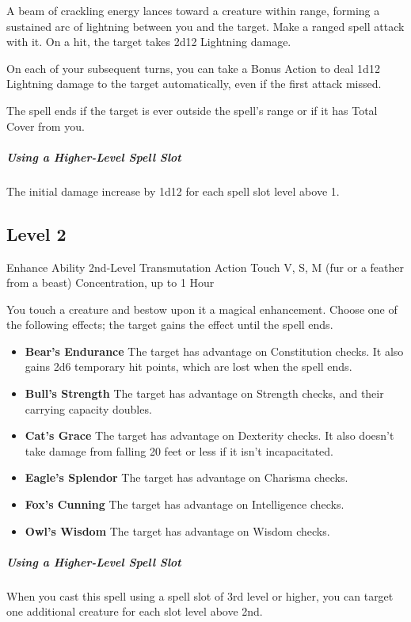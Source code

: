 \documentclass[letterpaper,openany,oneside,twocolumn]{book}
\begin{document}
A beam of crackling energy lances toward a creature within range, forming a sustained arc of lightning between you and the target. Make a ranged spell attack with it. On a hit, the target takes 2d12 Lightning damage.

On each of your subsequent turns, you can take a Bonus Action to deal 1d12 Lightning damage to the target automatically, even if the first attack missed.

The spell ends if the target is ever outside the spell's range or if it has Total Cover from you.

\subparagraph*{Using a Higher-Level Spell Slot} The initial damage increase by 1d12 for each spell slot level above 1.

\subsection*{Level 2}

\DndSpellHeader
  {Enhance Ability}
  {2nd-Level Transmutation}
  {Action}
  {Touch}
  {V, S, M (fur or a feather from a beast)}
  {Concentration, up to 1 Hour}

You touch a creature and bestow upon it a magical enhancement. Choose one of the following effects; the target gains the effect until the spell ends.
\begin{itemize}
	\renewcommand\labelitemi{\textbf{\textbullet}}
	\item \textbf{Bear's Endurance} The target has advantage on Constitution checks. It also gains 2d6 temporary hit points, which are lost when the spell ends.
	\item \textbf{Bull's Strength} The target has advantage on Strength checks, and their carrying capacity doubles.
	\item \textbf{Cat's Grace} The target has advantage on Dexterity checks. It also doesn’t take damage from falling 20 feet or less if it isn't incapacitated.
	\item \textbf{Eagle's Splendor} The target has advantage on Charisma checks.
	\item \textbf{Fox's Cunning} The target has advantage on Intelligence checks.
	\item \textbf{Owl's Wisdom} The target has advantage on Wisdom checks.
\end{itemize}

\subparagraph*{Using a Higher-Level Spell Slot} When you cast this spell using a spell slot of 3rd level or higher, you can target one additional creature for each slot level above 2nd.
\end{document}
